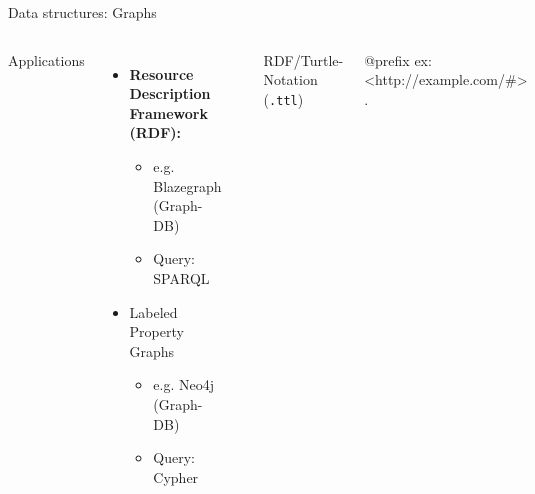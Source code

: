 \begin{frame}[fragile]{Data structures: Graphs}
  \begin{columns}[T,onlytextwidth]
    Applications
      \begin{itemize}\footnotesize
          \item \textbf{Resource Description Framework (RDF):} 
          \begin{itemize}\footnotesize
              \item e.g. Blazegraph (Graph-DB)
              \item Query: SPARQL
          \end{itemize}
          \item Labeled Property Graphs
          \begin{itemize}\footnotesize
              \item e.g. Neo4j (Graph-DB)
              \item Query: Cypher
          \end{itemize}
      \end{itemize}
      
      \begin{block}{}
        \includegraphics[width=0.97\textwidth]{img/graph.png}
      \end{block}


    RDF/Turtle-Notation (\texttt{.ttl})
\begin{turtlecode}
@prefix ex: <http://example.com/#> .


\end{turtlecode}
\end{columns}
\end{frame}
